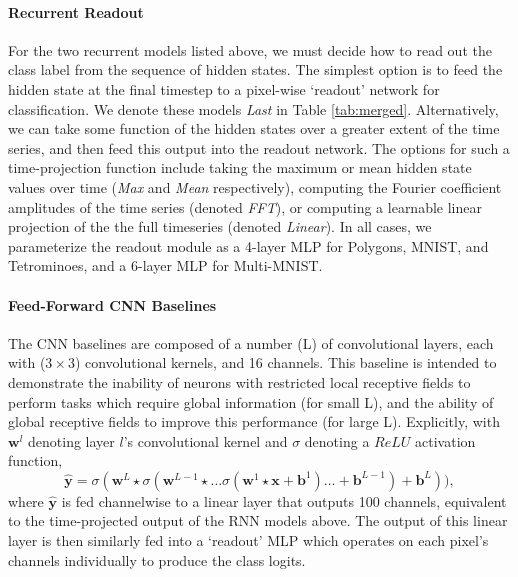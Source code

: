 \paragraph{Recurrent Readout} For the two recurrent models listed above, we must decide how to read out the class label from the sequence of hidden states. The simplest option is to feed the hidden state at the final timestep to a pixel-wise `readout' network for classification. We denote these models \emph{Last} in Table \ref{tab:merged}. Alternatively, we can take some function of the hidden states over a greater extent of the time series, and then feed this output into the readout network. The options for such a time-projection function include taking the maximum or mean hidden state values over time (\emph{Max} and \emph{Mean} respectively), computing the Fourier coefficient amplitudes of the time series (denoted \emph{FFT}), or computing a learnable linear projection of the the full timeseries (denoted \emph{Linear}). In all cases, we parameterize the readout module as a 4-layer MLP for Polygons, MNIST, and Tetrominoes, and a 6-layer MLP for Multi-MNIST. 

\paragraph{Feed-Forward CNN Baselines}
The CNN baselines are composed of a number (L) of convolutional layers, each with ($3\times3$) convolutional kernels, and 16 channels. This baseline is intended to demonstrate the inability of neurons with restricted local receptive fields to perform tasks which require global information (for small L), and the ability of global receptive fields to improve this performance (for large L). Explicitly, with $\mathbf{w}^l$ denoting layer $l$'s convolutional kernel and $\sigma$ denoting a $ReLU$ \citep{nair2010rectified} activation function,  
{\fontsize{9}{12}\selectfont
\begin{equation}
    \mathbf{\hat{y}} =  \sigma(\mathbf{w}^L \star \sigma(\mathbf{w}^{L-1} \star  \ldots \sigma(\mathbf{w}^1 \star \mathbf{x}+ \mathbf{b}^1)\ldots + \mathbf{b}^{L-1}) +  \mathbf{b}^{L})),
\end{equation}}
where $\mathbf{\hat{y}}$ is fed channelwise to a linear layer that outputs 100 channels, equivalent to the time-projected output of the RNN models above. The output of this linear layer is then similarly fed into a `readout' MLP which operates on each pixel's channels individually to produce the class logits.

